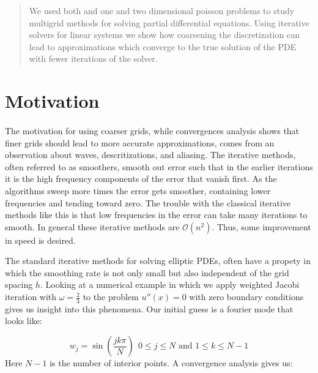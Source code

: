 \documentclass[pdftex,12pt,a4paper]{article}
\begin{document}


\vspace{2 cm}

\begin{abstract}
    We used both and one and two dimensional poisson problems to study multigrid methods for solving partial differential equations. Using iterative solvers for linear systems we show how coarsening the discretization can lead to approximations which converge to the true solution of the PDE with fewer iterations of the solver. 
\end{abstract}

\section{Motivation}
   
    \paragraph*{} The motivation for using coarser grids, while convergences analysis shows that finer grids should lead to more accurate approximations, comes from an observation about waves, descritizations, and aliasing. The iterative methods, often referred to as smoothers, smooth out error such that in the earlier iterations it is the high frequency components of the error that vanish first. As the algorithms sweep more times the error gets smoother, containing lower frequencies and tending toward zero. The trouble with the classical iterative methods like this is that low frequencies in the error can take many iterations to smooth. In general these iterative methods are $\mathcal{O}(n^2)$. Thus, some improvement in speed is desired.

    The standard iterative methods for solving elliptic PDEs, often have a propety in which the smoothing rate is not only small but also independent of the grid spacing $h$.  Looking at a numerical example in which we apply weighted Jacobi iteration with $\omega = \frac 2 3$ to the problem $u''(x) = 0$ with zero boundary conditions gives us insight into this phenomena. Our initial guess is a fourier mode that looks like: 

    $$
    w_j = \sin \left( \frac{jk \pi}{N}\right) ~~ 0 \leq j \leq N \text{ and } 1 \leq k \leq N-1$$
    Here $N-1$ is the number of interior points.  A convergence analysis gives us:  
\end{document}

